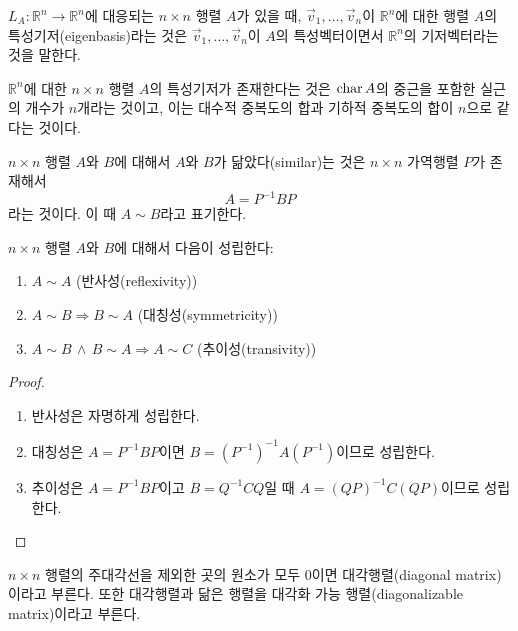 \documentclass[sections/engineering_mathematics_lecture_note.tex]{subfiles}
\begin{document}
\begin{definition}
    $L_A: \mathbb R^n \rightarrow \mathbb R^n$에 대응되는 $n \times n$ 행렬 $A$가 있을 때, $\vec v_1, \dots, \vec v_n$이 $\mathbb R^n$에 대한 행렬 $A$의 특성기저(eigenbasis)라는 것은 $\vec v_1, \dots, \vec v_n$이 $A$의 특성벡터이면서 $\mathbb R^n$의 기저벡터라는 것을 말한다.
\end{definition}

\begin{remark}
    $\mathbb R^n$에 대한 $n \times n$ 행렬 $A$의 특성기저가 존재한다는 것은 $\operatorname{char} A$의 중근을 포함한 실근의 개수가 $n$개라는 것이고, 이는 대수적 중복도의 합과 기하적 중복도의 합이 $n$으로 같다는 것이다.
\end{remark}

\begin{definition}
    $n \times n$ 행렬 $A$와 $B$에 대해서 $A$와 $B$가 닮았다(similar)는 것은 $n \times n$ 가역행렬 $P$가 존재해서
    \begin{equation*}
        A = P^{-1} B P
    \end{equation*}
    라는 것이다.
    이 때 $A \sim B$라고 표기한다.
\end{definition}

\begin{theorem}
    $n \times n$ 행렬 $A$와 $B$에 대해서 다음이 성립한다:
    \begin{enumerate}
        \item $A \sim A$ (반사성(reflexivity))
        \item $A \sim B \Rightarrow B \sim A$ (대칭성(symmetricity))
        \item $A \sim B \,\wedge\, B \sim A \Rightarrow A \sim C$ (추이성(transivity))
    \end{enumerate}
\end{theorem}

\begin{proof}
    \leavevmode
    \begin{enumerate}
        \item 반사성은 자명하게 성립한다.
        \item 대칭성은 $A = P^{-1} B P$이면 $B = (P^{-1})^{-1} A (P^{-1})$이므로 성립한다.
        \item 추이성은 $A = P^{-1}BP$이고 $B = Q^{-1} C Q$일 때 $A = (QP)^{-1} C (QP)$이므로 성립한다.
    \end{enumerate}
\end{proof}

\begin{definition}
    $n \times n$ 행렬의 주대각선을 제외한 곳의 원소가 모두 0이면 대각행렬(diagonal matrix)이라고 부른다.
    또한 대각행렬과 닮은 행렬을 대각화 가능 행렬(diagonalizable matrix)이라고 부른다.
\end{definition}
\end{document}
